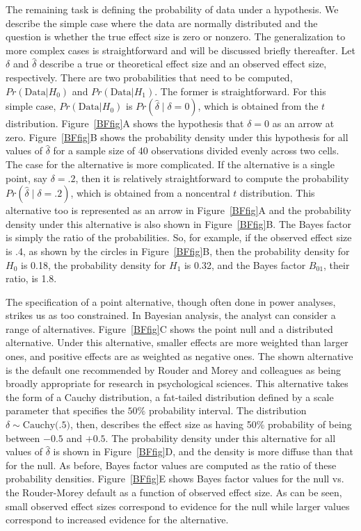 \documentclass[man]{apa6}
\begin{document}
The remaining task is defining the probability of data under a hypothesis.  We describe the simple case where the data are normally distributed and the question is whether the true effect size is zero or nonzero.  The generalization to more complex cases is straightforward and will be discussed briefly thereafter.  Let $\delta$ and $\hat{\delta}$ describe a true or theoretical effect size and an observed effect size, respectively.  There are two probabilities that need to be computed,   $Pr(\mbox{Data} | H_0)$ and $Pr(\mbox{Data} | H_1)$.   The former is straightforward.  For this simple case, $Pr(\mbox{Data} | H_0)$ is $Pr(\hat{\delta} \mid \delta=0)$, which is obtained from the $t$ distribution.  Figure~\ref{BFfig}A shows the hypothesis that $\delta=0$ as an arrow at zero.  Figure~\ref{BFfig}B shows the probability density under this hypothesis for all values of $\hat{\delta}$ for a sample size of 40 observations divided evenly across two cells. The case for the alternative is more complicated.  If the alternative is a single point, say $\delta=.2$, then it is relatively straightforward to compute the probability $Pr(\hat{\delta} \mid \delta=.2)$, which is obtained from a noncentral $t$ distribution.   This alternative too is represented as an arrow in Figure~\ref{BFfig}A and the probability density under this alternative is also shown in Figure~\ref{BFfig}B. The Bayes factor is simply the ratio of the probabilities.  So, for example, if the observed effect size is .4, as shown by the circles in Figure~\ref{BFfig}B, then the probability density for $H_0$ is 0.18, the probability density for $H_1$ is 0.32, and the Bayes factor $B_{01}$, their ratio, is 1.8. 

The specification of a point alternative, though often done in power analyses, strikes us as too constrained.  In Bayesian analysis, the analyst can consider a range of alternatives.  Figure~\ref{BFfig}C shows the point null and a distributed alternative.  Under this alternative, smaller effects are more weighted than larger ones, and positive effects are as weighted as negative ones.  The shown alternative is the default one recommended by Rouder and Morey and colleagues \citep{Rouder:etal:2009a,Morey:Rouder:2011,Rouder:Morey:2012,Rouder:etal:2012} as being broadly appropriate for research in psychological sciences. This alternative takes the form of a Cauchy distribution, a fat-tailed distribution defined by a scale parameter that specifies the $50\%$ probability interval. The distribution $\delta \sim \mbox{Cauchy(.5)}$, then, describes the effect size as having 50\% probability of being between $-0.5$ and $+0.5$. The probability density under this alternative for all values of $\hat{\delta}$ is shown in Figure~\ref{BFfig}D, and the density is more diffuse than that for the null.   As before, Bayes factor values are computed as the ratio of these probability densities.   Figure~\ref{BFfig}E shows Bayes factor values for the null vs. the Rouder-Morey default as a function of observed effect size. As can be seen, small observed effect sizes correspond to evidence for the null while larger values correspond to increased evidence for the alternative.  %
\end{document}
